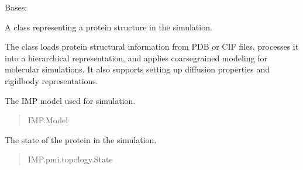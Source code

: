\documentclass[letterpaper,10pt,english]{sphinxmanual}
\begin{document}

\begin{fulllineitems}
\label{\detokenize{src:src.Protein_Class.ProteinStructure}}
\pysigstartsignatures
{}
\pysigstopsignatures
\sphinxAtStartPar
Bases: 

\sphinxAtStartPar
A class representing a protein structure in the simulation.

\sphinxAtStartPar
The  class loads protein structural information from PDB or CIF files,
processes it into a hierarchical representation, and applies coarse\sphinxhyphen{}grained modeling
for molecular simulations. It also supports setting up diffusion properties and
rigid\sphinxhyphen{}body representations.

\begin{fulllineitems}
\label{\detokenize{src:src.Protein_Class.ProteinStructure.model}}
\pysigstartsignatures
{}
\pysigstopsignatures
\sphinxAtStartPar
The IMP model used for simulation.
\begin{quote}\begin{description}
\sphinxAtStartPar
IMP.Model

\end{description}\end{quote}

\end{fulllineitems}


\begin{fulllineitems}
\label{\detokenize{src:src.Protein_Class.ProteinStructure.state}}
\pysigstartsignatures
{}
\pysigstopsignatures
\sphinxAtStartPar
The state of the protein in the simulation.
\begin{quote}\begin{description}
\sphinxAtStartPar
IMP.pmi.topology.State


\end{description}
\end{quote}
\end{fulllineitems}
\end{fulllineitems}
\end{document}
